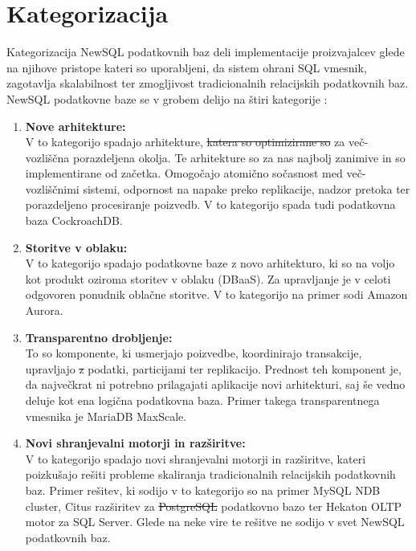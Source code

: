 \documentclass[a4paper, 12pt]{book}
\providecommand{\DIFaddtex}[1]{{\protect\color{blue}\uwave{#1}}} %
\providecommand{\DIFdeltex}[1]{{\protect\color{red}\sout{#1}}}                      %
\providecommand{\DIFaddbegin}{} %
\providecommand{\DIFaddend}{} %
\providecommand{\DIFdelbegin}{} %
\providecommand{\DIFdelend}{} %
\providecommand{\DIFadd}[1]{\texorpdfstring{\DIFaddtex{#1}}{#1}} %
\providecommand{\DIFdel}[1]{\texorpdfstring{\DIFdeltex{#1}}{}} %
\newcommand{\DIFscaledelfig}{0.5}
\newlength{\DIFdelgraphicswidth} %
\newlength{\DIFdelgraphicsheight} %
\newcommand{\DIFaddincludegraphics}[2][]{{\color{blue}\fbox{\DIFOincludegraphics[#1]{#2}}}} %
\newcommand{\DIFdelincludegraphics}[2][]{%
\sbox{\DIFdelgraphicsbox}{\DIFOincludegraphics[#1]{#2}}%
\settoboxwidth{\DIFdelgraphicswidth}{\DIFdelgraphicsbox} %
\settoboxtotalheight{\DIFdelgraphicsheight}{\DIFdelgraphicsbox} %
\scalebox{\DIFscaledelfig}{%
\parbox[b]{\DIFdelgraphicswidth}{\usebox{\DIFdelgraphicsbox}\\[-\baselineskip] \rule{\DIFdelgraphicswidth}{0em}}\llap{\resizebox{\DIFdelgraphicswidth}{\DIFdelgraphicsheight}{%
\setlength{\unitlength}{\DIFdelgraphicswidth}%
\begin{picture}(1,1)%
\thicklines\linethickness{2pt} %
{\color[rgb]{1,0,0}\put(0,0){\framebox(1,1){}}}%
{\color[rgb]{1,0,0}\put(0,0){\line( 1,1){1}}}%
{\color[rgb]{1,0,0}\put(0,1){\line(1,-1){1}}}%
\end{picture}%
}\hspace*{3pt}}} %
} %
\DeclareRobustCommand{\DIFaddbegin}{\DIFOaddbegin \let\includegraphics\DIFaddincludegraphics} %
\DeclareRobustCommand{\DIFaddend}{\DIFOaddend \let\includegraphics\DIFOincludegraphics} %
\DeclareRobustCommand{\DIFdelbegin}{\DIFOdelbegin \let\includegraphics\DIFdelincludegraphics} %
\DeclareRobustCommand{\DIFdelend}{\DIFOaddend \let\includegraphics\DIFOincludegraphics} %
\begin{document}
\section{Kategorizacija}
Kategorizacija NewSQL podatkovnih baz deli implementacije proizvajalcev glede na njihove pristope kateri so uporabljeni, da sistem ohrani SQL vmesnik, zagotavlja skalabilnost ter zmogljivost tradicionalnih relacijskih podatkovnih baz. \cite{NewSQLNewWayToHandleBigData} NewSQL podatkovne baze se v grobem delijo na štiri kategorije \cite{Mikuletic2015Feb}:

\begin{enumerate}
    \item \textbf{Nove arhitekture:}\\V to kategorijo spadajo arhitekture, \DIFdelbegin \DIFdel{katera so optimizirane so }\DIFdelend \DIFaddbegin \DIFadd{katere so optimizirane }\DIFaddend za več-vozliščna porazdeljena okolja. Te arhitekture so za nas najbolj zanimive in so implementirane od začetka. Omogočajo atomično sočasnost med več-vozliščnimi sistemi, odpornost na napake preko replikacije, nadzor pretoka ter porazdeljeno procesiranje poizvedb. V to kategorijo spada tudi podatkovna baza CockroachDB. \cite{Pavlo2016Sep}
    \item \textbf{Storitve v oblaku:}\\V to kategorijo spadajo podatkovne baze z novo arhitekturo, ki so na voljo kot produkt oziroma storitev v oblaku (DBaaS). Za upravljanje je v celoti odgovoren ponudnik oblačne storitve. V to kategorijo na primer sodi Amazon Aurora. \cite{Pavlo2016Sep}
    \item \textbf{Transparentno drobljenje:}\\To so komponente, ki usmerjajo poizvedbe, koordinirajo transakcije, upravljajo \DIFdelbegin \DIFdel{z }\DIFdelend \DIFaddbegin \DIFadd{s }\DIFaddend podatki, particijami ter replikacijo. Prednost teh komponent je, da največkrat ni potrebno prilagajati aplikacije novi arhitekturi, saj še vedno deluje kot ena logična podatkovna baza. Primer takega transparentnega vmesnika je MariaDB MaxScale. \cite{Pavlo2016Sep}
    \item \textbf{Novi shranjevalni motorji in razširitve:}\\V to kategorijo spadajo novi shranjevalni motorji in razširitve, kateri poizkušajo rešiti probleme skaliranja tradicionalnih relacijskih podatkovnih baz. \cite{Kumar2018Jun} Primer rešitev, ki sodijo v to kategorijo so na primer MySQL NDB cluster, Citus razširitev za \DIFdelbegin \DIFdel{PostgreSQL }\DIFdelend \DIFaddbegin \DIFadd{Postgres }\DIFaddend podatkovno bazo ter Hekaton OLTP motor za SQL Server. Glede na neke vire \cite{Pavlo2016Sep} te rešitve ne sodijo v svet NewSQL podatkovnih baz. 
\end{enumerate}
\end{document}
